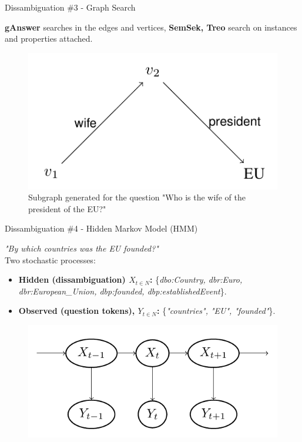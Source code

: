 \documentclass{beamer}
\begin{document}
\begin{frame}{Dissambiguation \#3 - Graph Search}
  \begin{cardTiny}
    \textbf{gAnswer} searches in the edges and vertices, \textbf{SemSek, Treo} search on instances and properties attached.
    \begin{figure}\label{fig:subgraph}
      \centering
      \includegraphics[height=0.45\textheight]{./res/subgraph.png}
      \caption{Subgraph generated for the question "Who is the wife of the president of the EU?"}
    \end{figure}
  \end{cardTiny}
\end{frame}

\note{}

\begin{frame}{Dissambiguation \#4 - Hidden Markov Model (HMM)}
  \begin{cardTiny}
    \textit{"By which countries was the EU founded?"} \\
    Two stochastic processes:
    \begin{itemize}
      \item \textbf{Hidden (dissambiguation) $X_{t \in N}$:} \{\textit{dbo:Country, dbr:Euro, dbr:European\_Union, dbp:founded, dbp:establishedEvent}\}.
      \item \textbf{Observed (question tokens), $Y_{t \in N}$:} \{\textit{"countries", "EU", "founded"}\}.
    \end{itemize}
  \end{cardTiny}
  \begin{cardTiny}
    \begin{figure}\label{fig:hmm}
      \centering
      \includegraphics[height=0.30\textheight]{./res/hmm.png}
    \end{figure}
  \end{cardTiny}
\end{frame}
\end{document}
